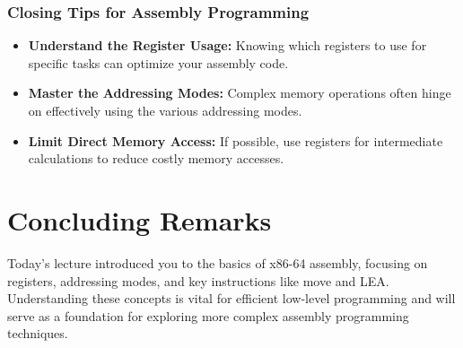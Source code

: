 \documentclass{article}
\begin{document}
\subsubsection{Closing Tips for Assembly Programming}

\begin{itemize}
  \item \textbf{Understand the Register Usage:} Knowing which registers to use for specific tasks can optimize your assembly code.
  \item \textbf{Master the Addressing Modes:} Complex memory operations often hinge on effectively using the various addressing modes.
  \item \textbf{Limit Direct Memory Access:} If possible, use registers for intermediate calculations to reduce costly memory accesses.
\end{itemize}

\section{Concluding Remarks}

Today's lecture introduced you to the basics of x86-64 assembly, focusing on registers, addressing modes, and key instructions like move and LEA. Understanding these concepts is vital for efficient low-level programming and will serve as a foundation for exploring more complex assembly programming techniques.
\end{document}
